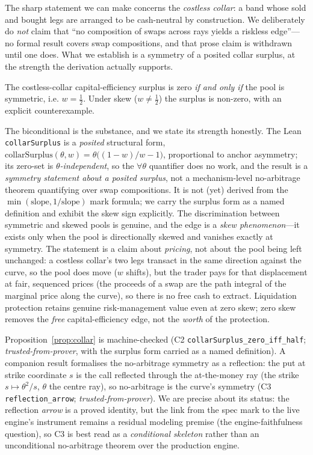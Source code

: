 \documentclass[runningheads]{llncs}
\newcommand{\tfp}{\emph{trusted-from-prover}}
\begin{document}
The sharp statement we can make concerns the \emph{costless collar}: a band whose
sold and bought legs are arranged to be cash-neutral by construction. We
deliberately do \emph{not} claim that ``no composition of swaps across rays
yields a riskless edge''---no formal result covers swap compositions, and that
prose claim is withdrawn until one does. What we establish is a symmetry of a
posited collar surplus, at the strength the derivation actually supports.

\begin{proposition}\label{prop:collar}
The costless-collar capital-efficiency surplus is zero \emph{if and only if} the
pool is symmetric, i.e. $w=\tfrac12$. Under skew ($w\ne\tfrac12$) the surplus is
non-zero, with an explicit counterexample.
\end{proposition}

The biconditional is the substance, and we state its strength honestly. The Lean
\texttt{collarSurplus} is a \emph{posited} structural form,
$\mathrm{collarSurplus}(\theta,w)=\theta\bigl((1-w)/w-1\bigr)$, proportional to
anchor asymmetry; its zero-set is \emph{$\theta$-independent}, so the $\forall\theta$
quantifier does no work, and the result is a \emph{symmetry statement about a
posited surplus}, not a mechanism-level no-arbitrage theorem quantifying over swap
compositions. It is not (yet) derived from the $\min(\mathrm{slope},
1/\mathrm{slope})$ mark formula; we carry the surplus form as a named definition
and exhibit the skew sign explicitly. The discrimination between symmetric and
skewed pools is genuine, and the edge is a \emph{skew phenomenon}---it exists only
when the pool is directionally skewed and vanishes exactly at symmetry. The statement is a
claim about \emph{pricing}, not about the pool being left unchanged: a costless
collar's two legs transact in the same direction against the curve, so the pool
does move ($w$ shifts), but the trader pays for that displacement at fair,
sequenced prices (the proceeds of a swap are the path integral of the marginal
price along the curve), so there is no free cash to extract. Liquidation
protection retains genuine risk-management value even at zero skew; zero skew
removes the \emph{free} capital-efficiency edge, not the \emph{worth} of the
protection.

Proposition~\ref{prop:collar} is machine-checked (C2
\texttt{collarSurplus\_zero\_iff\_half}; \tfp{}, with the surplus form carried as
a named definition). A companion result formalises the no-arbitrage symmetry as a
reflection: the put at strike coordinate $s$ is the call reflected through the
at-the-money ray (the strike $s\mapsto\theta^{2}/s$, $\theta$ the centre ray), so
no-arbitrage is the curve's symmetry (C3 \texttt{reflection\_arrow}; \tfp{}). We are precise about its
status: the reflection \emph{arrow} is a proved identity, but the link from the
spec mark to the live engine's instrument remains a residual modeling premise (the
engine-faithfulness question), so C3 is best read as a \emph{conditional skeleton}
rather than an unconditional no-arbitrage theorem over the production engine.
\end{document}
